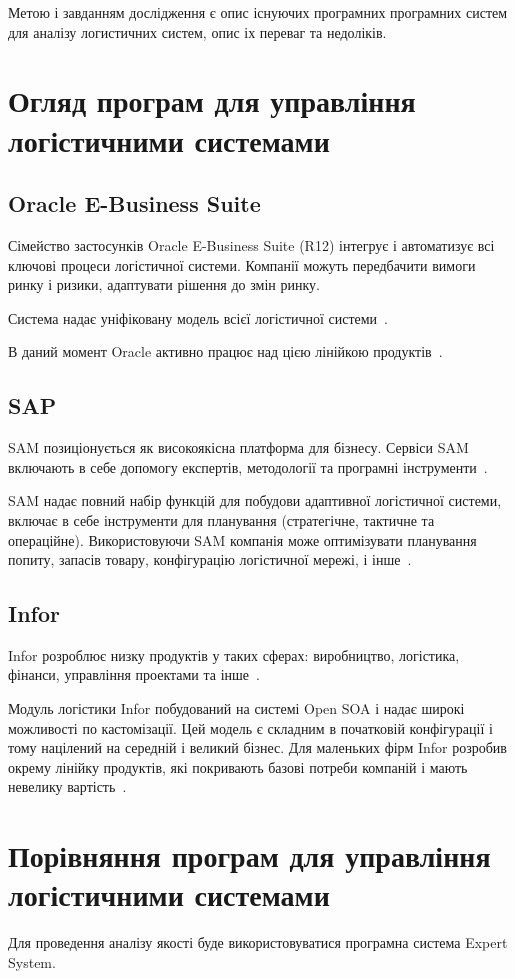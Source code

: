 Метою і завданням дослідження є опис існуючих програмних програмних систем для аналізу логистичних систем, опис іх переваг та недоліків.

\section{Огляд програм для управління логістичними системами}
\subsection{Oracle E-Business Suite}
Сімейство застосунків Oracle E-Business Suite (R12) інтегрує і автоматизує всі ключові процеси логістичної системи. Компанії можуть передбачити вимоги ринку і ризики, адаптувати рішення до змін ринку.

Система надає уніфіковану модель всієї логістичної системи~\cite{Wanga}.

В даний момент Oracle активно працює над цією лінійкою продуктів~\cite{Wanga}.

\subsection{SAP}
SAM позиціонується як високоякісна платформа для бізнесу.
Сервіси SAM включають в себе допомогу експертів, методології та програмні інструменти~\cite{Wanga}.

SAM надає повний набір функцій для побудови адаптивної логістичної системи, включає в себе інструменти для планування (стратегічне, тактичне та операційне).
Використовуючи SAM компанія може оптимізувати планування попиту, запасів товару, конфігурацію логістичної мережі, і інше~\cite{Wanga}.

\subsection{Infor}
Infor розроблює низку продуктів у таких сферах: виробництво, логістика, фінанси, управління проектами та інше~\cite{Wanga}.

Модуль логістики Infor побудований на системі Open SOA і надає широкі можливості по кастомізації.
Цей модель є складним в початковій конфігурації і тому націлений на середній і великий бізнес.
Для маленьких фірм Infor розробив окрему лінійку продуктів, які покривають базові потреби компаній і мають невелику вартість~\cite{Wanga}. 

\section{Порівняння програм для управління логістичними системами}
Для проведення аналізу якості буде використовуватися програмна система Expert System.

